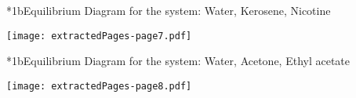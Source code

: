 \documentclass[\mainfilename]{subfiles}
\begin{document}
\begin{sectionBox}*1b{Equilibrium Diagram for the system: Water, Kerosene, Nicotine} %
    
    \begin{center}
        \texttt{[image: extractedPages-page7.pdf]}
    \end{center}
    
\end{sectionBox}

\begin{sectionBox}*1b{Equilibrium Diagram for the system: Water, Acetone, Ethyl acetate} %
    
    \begin{center}
        \texttt{[image: extractedPages-page8.pdf]}
    \end{center}
    
\end{sectionBox}
\end{document}
